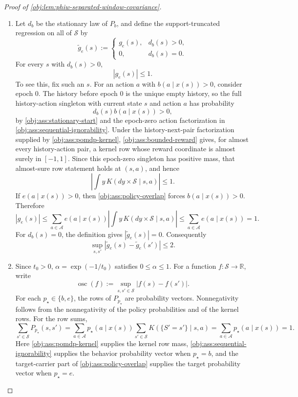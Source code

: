 \begin{proof}[Proof of \cref{obj:lem:phiw-separated-window-covariance}]
\begin{enumerate}
\item Let \(d_b\) be the stationary law of \(P_b\), and define the support-truncated regression on all of \(\mathcal S\) by
\[
\widetilde g_e(s):=
\begin{cases}
g_e(s),& d_b(s)>0,\\
0,& d_b(s)=0.
\end{cases}
\]
For every \(s\) with \(d_b(s)>0\),
\[
|g_e(s)|\le 1 .
\]
To see this, fix such an \(s\). For an action \(a\) with \(b(a\mid x(s))>0\), consider epoch \(0\). The history before epoch \(0\) is the unique empty history, so the full history-action singleton with current state \(s\) and action \(a\) has probability
\[
d_b(s)b(a\mid x(s))>0,
\]
by \cref{obj:ass:stationary-start} and the epoch-zero action factorization in \cref{obj:ass:sequential-ignorability}. Under the history-next-pair factorization supplied by \cref{obj:ass:pomdp-kernel}, \cref{obj:ass:bounded-reward} gives, for almost every history-action pair, a kernel row whose reward coordinate is almost surely in \([-1,1]\). Since this epoch-zero singleton has positive mass, that almost-sure row statement holds at \((s,a)\), and hence
\[
\left|\int y\,K(dy\times\mathcal S\mid s,a)\right|\le 1 .
\]
If \(e(a\mid x(s))>0\), then \cref{obj:ass:policy-overlap} forces \(b(a\mid x(s))>0\). Therefore
\[
|g_e(s)|
\le
\sum_{a\in\mathcal A} e(a\mid x(s))
\left|\int y\,K(dy\times\mathcal S\mid s,a)\right|
\le
\sum_{a\in\mathcal A} e(a\mid x(s))
=1.
\]
For \(d_b(s)=0\), the definition gives \(|\widetilde g_e(s)|=0\). Consequently
\[
\sup_{s,s'}|\widetilde g_e(s)-\widetilde g_e(s')|\le 2 .
\] %

\item Since \(t_0>0\), \(\alpha=\exp(-1/t_0)\) satisfies \(0\le \alpha\le 1\). For a function \(f:\mathcal S\to\mathbb R\), write
\[
\operatorname{osc}(f):=\sup_{s,s'\in\mathcal S}|f(s)-f(s')|.
\]
For each \(p_\star\in\{b,e\}\), the rows of \(P_{p_\star}\) are probability vectors. Nonnegativity follows from the nonnegativity of the policy probabilities and of the kernel rows. For the row sums,
\[
\sum_{s'\in\mathcal S}P_{p_\star}(s,s')
=
\sum_{a\in\mathcal A}p_\star(a\mid x(s))
   \sum_{s'\in\mathcal S}K(\{S'=s'\}\mid s,a)
=
\sum_{a\in\mathcal A}p_\star(a\mid x(s))
=1.
\]
Here \cref{obj:ass:pomdp-kernel} supplies the kernel row mass, \cref{obj:ass:sequential-ignorability} supplies the behavior probability vector when \(p_\star=b\), and the target-carrier part of \cref{obj:ass:policy-overlap} supplies the target probability vector when \(p_\star=e\).


\end{enumerate}
\end{proof}
